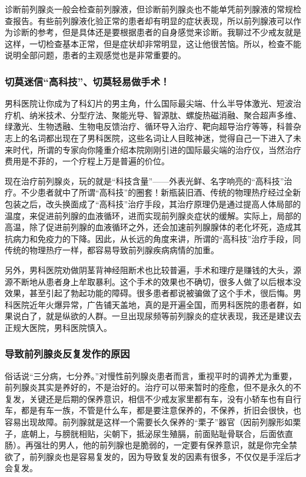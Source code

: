 \documentclass{ctexart}
\begin{document}
诊断前列腺炎一般会检查前列腺液，但诊断前列腺炎也不能单凭前列腺液的常规检查报告。有些前列腺液化验正常的患者却有明显的症状表现，所以前列腺液可以作为诊断的参考，但是具体还是要根据患者的自身感觉来诊断。我聊过不少戒友就是这样，一切检查基本正常，但是症状却非常明显，这让他很苦恼。所以，检查不能说明全部问题，患者的主观感觉也是非常重要的。

\subsubsection{切莫迷信“高科技”、切莫轻易做手术！}

男科医院让你成为了科幻片的男主角，什么国际最尖端、什么半导体激光、短波治疗机、纳米技术、分型疗法、聚能光导、智源肽、螺旋热磁消融、聚合超声多维、绿激光、生物透融、生物电反馈治疗、循环导入治疗、靶向超导治疗等等，科普杂志上的名词都出现在了男科医院，这些名词让人目眩神迷，觉得自己一下进入了未来时代，所谓的专家向你隆重介绍本院刚刚引进的国际最尖端的治疗仪，当然治疗费用是不菲的，一个疗程上万是普遍的价位。

现在治疗前列腺炎，玩的就是“科技含量”——外表光鲜、名字响亮的“高科技”治疗。不少患者就中了所谓“高科技”的圈套！新瓶装旧酒、传统的物理热疗经过全新包装之后，改头换面成了“高科技”治疗手段，其治疗原理仍是通过提高人体局部的温度，来促进前列腺的血液循环，进而实现前列腺炎症状的缓解。实际上，局部的高温，除了促进前列腺的血液循环之外，还会加速前列腺腺体的老化坏死，造成其抗病力和免疫力的下降。因此，从长远的角度来讲，所谓的“高科技”治疗手段，同传统的物理热疗一样，都容易导致前列腺疾病病情的加重。

另外，男科医院劝做阴茎背神经阻断术也比较普遍，手术和理疗是赚钱的大头，源源不断地从患者身上牟取暴利。这个手术的效果也不确切，很多人做了以后根本没效果，甚至引起了勃起功能的障碍。很多患者都说被骗做了这个手术，很后悔。男科医院近年火爆异常，广告铺天盖地，真的是开遍全国，而男科医院的患者群，如果说白了，就是纵欲的人群。一旦出现尿频等前列腺炎的症状表现，我还是建议去正规大医院，男科医院慎入。

\subsubsection{导致前列腺炎反复发作的原因}

俗话说“三分病，七分养。”对慢性前列腺炎患者而言，重视平时的调养尤为重要，前列腺炎其实是养好的，不是治好的。治疗可以带来暂时的痊愈，但不是永久的不复发，关键还是后期的保养意识，相信不少戒友家里都有车，没有小轿车也有自行车，都是有车一族，不管是什么车，都是要注意保养的，不保养，折旧会很快，也容易出现故障。前列腺就是这样一个需要长久保养的“栗子”器官（因前列腺形如栗子，底朝上，与膀胱相贴，尖朝下，抵泌尿生殖膈，前面贴耻骨联合，后面依直肠）。再强壮的男人，他的前列腺也是脆弱的，一定要有保养意识，就是你完全禁欲了，前列腺炎也是容易复发的，因为导致复发的因素有很多，不仅仅是手淫后才会复发。
\end{document}
